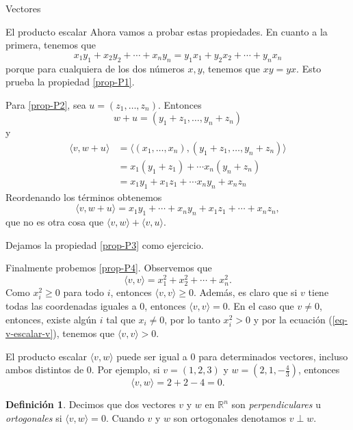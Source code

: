 \documentclass[a4paper,12pt,twoside,spanish]{amsbook}
\theoremstyle{definition}
\newtheorem{definicion}{Definici\'on}[section]
\theoremstyle{remark}
\begin{document}
\begin{chapter}{Vectores}
\begin{section}{El producto escalar}
		Ahora vamos a probar estas propiedades. En cuanto a la primera, tenemos que
		\begin{equation*}
			x_1y_1 + x_2y_2+\cdots+x_ny_n = y_1x_1 + y_2x_2+\cdots+y_nx_n
		\end{equation*}
		porque para cualquiera de los dos números $x, y$, tenemos que $xy=yx$. Esto prueba la propiedad \ref{prop-P1}. 
		
		Para \ref{prop-P2}, sea $u = (z_1, \ldots, z_n)$. Entonces
		\begin{equation*}
			w + u = (y_1+z_1, \ldots, y_n+ z_n)
		\end{equation*}
		y
		\begin{align*}
			\langle v , w + u \rangle &= \langle (x_1, \ldots,x_n) , (y_1+z_1, \ldots, y_n+ z_n) \rangle\\
			&= x_1(y_1+z_1) + \cdots x_n(y_n+z_n) \\
			&= x_1y_1+x_1z_1 + \cdots x_ny_n+x_nz_n
		\end{align*}
		Reordenando los términos obtenemos
		\begin{equation*}
				\langle v , w + u \rangle =  x_1y_1+\cdots +  x_ny_n +x_1z_1 + \cdots+x_nz_n,
		\end{equation*}
		que no es otra cosa que $\langle v , w \rangle + \langle v , u \rangle$.
		
		Dejamos la propiedad \ref{prop-P3} como ejercicio.
		
		Finalmente probemos \ref{prop-P4}. Observemos que 
		\begin{equation}\label{eq-v-escalar-v}
			\langle v , v \rangle = x_1^2 + x_2^2 + \cdots + x_n^2.
		\end{equation}
		Como $x_i^2 \ge 0$ para todo $i$,  entonces $\langle v , v \rangle \ge 0$. Además, es claro que si $v$ tiene todas las coordenadas iguales a 0,  entonces  $\langle v , v \rangle =0$. En  el caso que $v\not=0$, entonces,  existe algún $i$  tal que  $x_i \ne 0$, por lo tanto $x_i^2>0$ y por la ecuación (\ref{eq-v-escalar-v}), tenemos que  $\langle v , v \rangle>0$.
		
		
		
		
		El producto escalar $\langle v , w \rangle$ puede ser  igual a 0 para determinados  vectores,  incluso ambos distintos de 0.  Por ejemplo, si $v = (1,2,3)$ y $w = (2, 1, -\frac43)$,  entonces
		\begin{equation*}
			\langle v , w \rangle = 2 + 2 -4 =0.
		\end{equation*}
		\begin{definicion}
			Decimos que dos vectores $v$ y $w$ en $\mathbb R^n$ son  \textit{perpendiculares} u \textit{ortogonales} si  $\langle v , w \rangle=0$. Cuando $v$ y $w$ son ortogonales  denotamos $v \perp w$.
		\end{definicion}
		

\end{section}
\end{chapter}
\end{document}
